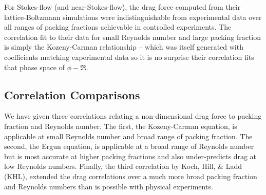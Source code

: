 For Stokes-flow (and near-Stokes-flow), the drag force computed from their lattice-Boltzmann simulations were indistinguishable from experimental data over all ranges of packing fractions achievable in controlled experiments. The correlation fit to their data for small Reynolds number and large packing fraction is simply the Kozeny-Carman relationship -- which was itself generated with coefficients matching experimental data so it is no surprise their correlation fits that phase space of $\phi-\Re$.

\subsection{Correlation Comparisons}
We have given three correlations relating a non-dimensional drag force to packing fraction and Reynolds number. The first, the Kozeny-Carman equation, is applicable at small Reynolds number and broad range of packing fraction. The second, the Ergun equation, is applicable at a broad range of Reynolds number but is most accurate at higher packing fractions and also under-predicts drag at low Reynolds numbers. Finally, the third correlation by Koch, Hill, \& Ladd (KHL), extended the drag correlations over a much more broad packing fraction and Reynolds numbers than is possible with physical experiments. 

